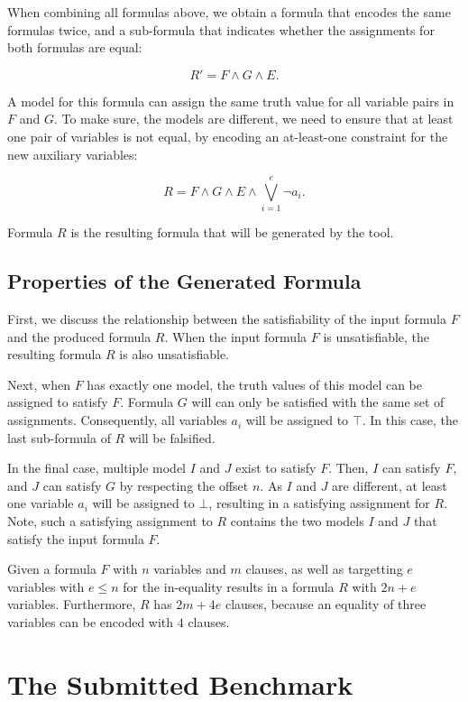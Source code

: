 \documentclass[conference]{IEEEtran}
\begin{document}
When combining all formulas above, we obtain a formula that encodes the same formulas twice, and a sub-formula that indicates whether the assignments for both formulas are equal:

\[R' = F \land G \land E. \]

\noindent
A model for this formula can assign the same truth value for all variable pairs in $F$ and $G$.
To make sure, the models are different, we need to ensure that at least one pair of variables is not equal, by encoding an at-least-one constraint for the new auxiliary variables:

\[R = F \land G \land E \land \bigvee_{i=1}^{e} \neg a_i.  \]

\noindent
Formula $R$ is the resulting formula that will be generated by the tool.

\subsection{Properties of the Generated Formula}

First, we discuss the relationship between the satisfiability of the input formula $F$ and the produced formula $R$.
When the input formula $F$ is unsatisfiable, the resulting formula $R$ is also unsatisfiable.

Next, when $F$ has exactly one model, the truth values of this model can be assigned to satisfy $F$.
Formula $G$ will can only be satisfied with the same set of assignments.
Consequently, all variables $a_i$ will be assigned to $\top$.
In this case, the last sub-formula of $R$ will be falsified.

In the final case, multiple model $I$ and $J$ exist to satisfy $F$.
Then, $I$ can satisfy $F$, and $J$ can satisfy $G$ by respecting the offset $n$.
As $I$ and $J$ are different, at least one variable $a_i$ will be assigned to $\bot$, resulting in a satisfying assignment for $R$.
Note, such a satisfying assignment to $R$ contains the two models $I$ and $J$ that satisfy the input formula $F$.

Given a formula $F$ with $n$ variables and $m$ clauses, as well as targetting $e$ variables with $e \leq n$ for the in-equality results in a formula $R$ with $2n + e$ variables.
Furthermore, $R$ has $2m + 4e$ clauses, because an equality of three variables can be encoded with $4$ clauses.

\section{The Submitted Benchmark}
\end{document}
